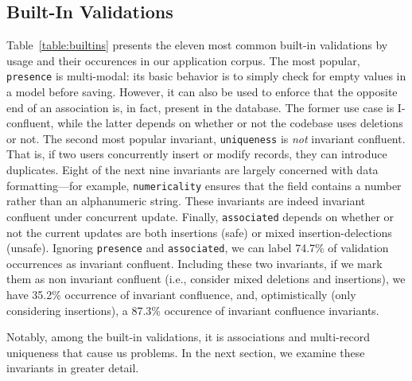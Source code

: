 \subsection{Built-In Validations}

Table~\ref{table:builtins} presents the eleven most common built-in
validations by usage and their occurences in our application
corpus. The most popular, \texttt{presence} is multi-modal: its basic
behavior is to simply check for empty values in a model before
saving. However, it can also be used to enforce that the opposite end
of an association is, in fact, present in the database. The former use
case is I-confluent, while the latter depends on whether or not the
codebase uses deletions or not. The second most popular invariant,
\texttt{uniqueness} is \textit{not} invariant confluent. That is, if
two users concurrently insert or modify records, they can 
introduce duplicates. Eight of the next nine invariants are largely
concerned with data formatting---for example, \texttt{numericality}
ensures that the field contains a number rather than an alphanumeric
string. These invariants are indeed invariant confluent under
concurrent update. Finally, \texttt{associated} depends on whether or
not the current updates are both insertions (safe) or mixed
insertion-delections (unsafe). Ignoring \texttt{presence} and
\texttt{associated}, we can label 74.7\% of validation occurrences as
invariant confluent. Including these two invariants, if we mark them
as non invariant confluent (i.e., consider mixed deletions and
insertions), we have 35.2\% occurrence of invariant confluence, and,
optimistically (only considering insertions), a 87.3\% occurence of
invariant confluence invariants.

Notably, among the built-in validations, it is associations and
multi-record uniqueness that cause us problems. In the next section,
we examine these invariants in greater detail.

